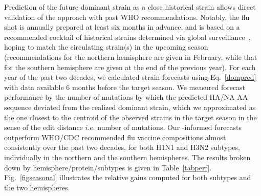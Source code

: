 \documentclass[onecolumn, compsoc,10pt]{IEEEtran}
\def\METHODS{Online Methods\xspace}
\begin{document}
Prediction of the future dominant strain as  a close historical strain  allows direct validation of the approach with past WHO recommendations. Notably, the flu shot  is annually prepared at least six months in advance, and is based on a recommended cocktail of historical strains determined via global surveillance~\cite{agor2018models}, hoping to match the circulating strain(s) in the upcoming  season (recommendations for the northern hemisphere are given in February, while that for the southern hemisphere are given at the end of the previous year). %
For each year of the past two decades, we calculated strain forecasts using  Eq.~\eqref{dompred} with data available 6 months before the target season. %
We  measured forecast performance by the number of mutations by which the predicted HA/NA AA sequence deviated from the realized dominant strain, which we approximated as the one closest to the centroid of the observed strains in the target season in the sense of the edit distance $i.e.$ number of mutations. Our \enet-informed forecasts outperform  WHO/CDC recommended flu vaccine compositions almost consistently over the past two decades, for both H1N1 and H3N2 subtypes, individually in the northern and the southern hemispheres. %
%
The  results  broken down by hemisphere/protein/subtypes is given in Table~\ref{tabperf}. Fig.~\ref{figseasonal} illustrates the relative gains computed for both subtypes and the two hemispheres. %
\end{document}
